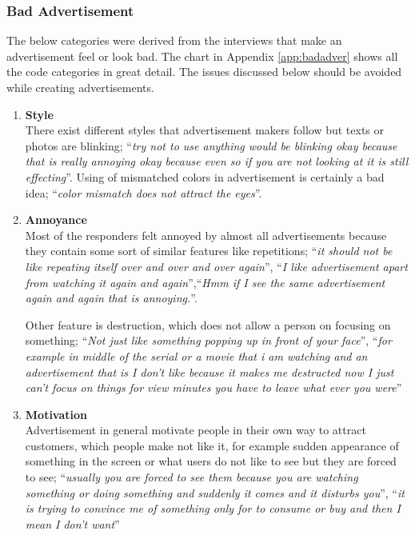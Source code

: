 


\subsubsection{Bad Advertisement}
The below categories were derived from the interviews that make an advertisement feel or look bad. The chart in Appendix \ref{app:badadver} shows all the code categories in great detail. The issues discussed below should be avoided while creating advertisements.

\begin{enumerate}
\item \textbf{Style} \\
There exist different styles that advertisement makers follow but texts or photos are blinking; ``\emph{try not to use anything would be blinking okay because that is really annoying okay because even so if you are not looking at it is still effecting}''. Using of mismatched colors in advertisement is certainly a bad idea; ``\emph{color mismatch does not attract the eyes}''.

\item \textbf{Annoyance} \\
Most of the responders felt annoyed by almost all advertisements because they contain some sort of similar features like repetitions; ``\emph{it should not be like repeating itself over and over and over again}'', ``\emph{I like advertisement apart from watching it again and again}'',``\emph{Hmm if I see the same advertisement again and again that is annoying.}''. 

Other feature is destruction, which does not allow a person on focusing on something; ``\emph{Not just like something popping up in front of your face}'', ``\emph{for example in middle of the serial or a movie that i am watching and an advertisement that is I don't like because it makes me destructed now I just can't focus on things for view minutes you have to leave what ever you were}''

\item \textbf{Motivation} \\
Advertisement in general motivate people in their own way to attract customers, which people make not like it, for example sudden appearance of something in the screen or what users do not like to see but they are forced to see; ``\emph{usually you are forced to see them because you are watching something or doing something and suddenly it comes and it disturbs you}'', ``\emph{it is trying to convince me of something only for to consume or buy and then I mean I don't want}''


\end{enumerate}
